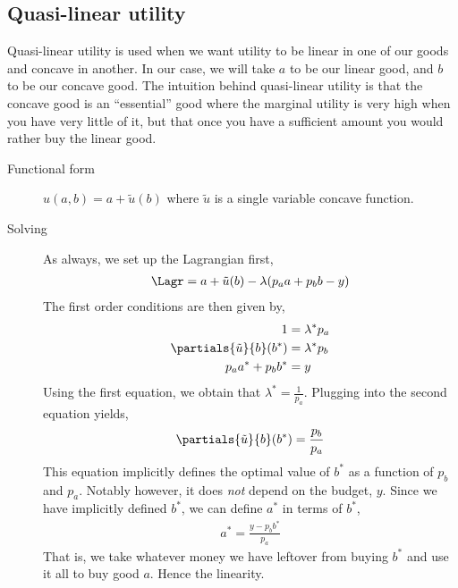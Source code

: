 \subsection*{Quasi-linear utility}
Quasi-linear utility is used when we want utility to be linear in one of our goods and concave in another. In our case, we will take $a$ to be our linear good, and $b$ to be our concave good. The intuition behind quasi-linear utility is that the concave good is an ``essential'' good where the marginal utility is very high when you have very little of it, but that once you have a sufficient amount you would rather buy the linear good.
\begin{description}
    \item[Functional form] $u(a, b) = a + \tilde{u}(b)$ where $\tilde{u}$ is a single variable concave function. 
    \item[Solving] As always, we set up the Lagrangian first,
    \begin{align*}
        \Lagr = a + \tilde{u}(b) - \lambda(p_a a + p_b b - y)
    \end{align*}
    The first order conditions are then given by,
    \begin{align*}
        1 &= \lambda^* p_a \\
        \partials{\tilde{u}}{b}(b^*) &= \lambda^* p_b \\ 
        p_a a^* + p_b b^* &= y
    \end{align*}
    Using the first equation, we obtain that $\lambda^* = \frac{1}{p_a}$. Plugging into the second equation yields,
    \begin{align*}
        \partials{\tilde{u}}{b}(b^*) = \frac{p_b}{p_a}
    \end{align*}
    This equation implicitly defines the optimal value of $b^*$ as a function of $p_b$ and $p_a$. Notably however, it does \emph{not} depend on the budget, $y$. Since we have implicitly defined $b^*$, we can define $a^*$ in terms of $b^*$,
    \begin{align*}
        a^* = \frac{y - p_b b^*}{p_a}
    \end{align*}
    That is, we take whatever money we have leftover from buying $b^*$ and use it all to buy good $a$. Hence the linearity.


\end{description}

